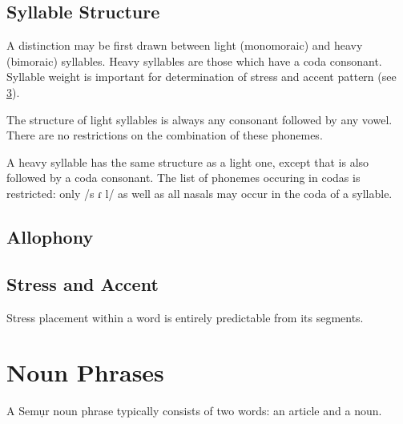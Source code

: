 \documentclass[paper=6in:9in]{scrbook}
\newcommand{\broad}[1]{/#1/}
\newcommand{\langname}{Semụr}
\begin{document}
\section{Syllable Structure}

A distinction may be first drawn between light (monomoraic) and heavy (bimoraic) syllables. Heavy syllables are those which have a coda consonant. Syllable weight is important for determination of stress and accent pattern (see \ref{sec:stressaccent}).

The structure of light syllables is always any consonant followed by any vowel. There are no restrictions on the combination of these phonemes. 

A heavy syllable has the same structure as a light one, except that is also followed by a coda consonant. The list of phonemes occuring in codas is restricted: only \broad{s ɾ l} as well as all nasals may occur in the coda of a syllable. 

\section{Allophony} \label{sec:allophony}


\section{Stress and Accent} \label{sec:stressaccent}
Stress placement within a word is entirely predictable from its segments. 

\chapter{Noun Phrases}

A \langname{} noun phrase typically consists of two words: an article and a noun. 
\end{document}

